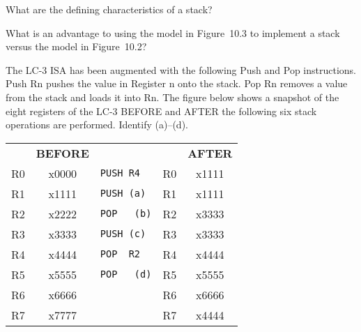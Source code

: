 \documentclass{patt}
\begin{document}
\FloatBarrier
\begin{exercises}

\item [8.1]
  What are the defining characteristics of a stack?

\item [8.2]
  What is an advantage to using the model in Figure~10.3 to implement
  a stack versus the model in Figure~10.2?

\item [8.3]
  The LC-3 ISA has been augmented with the following Push and Pop
  instructions. Push Rn pushes the value in Register n onto the stack.
  Pop Rn removes a value from the stack and loads it into Rn. The
  figure below shows a snapshot of the eight registers of the LC-3
  BEFORE and AFTER the following six stack operations are
  performed. Identify (a)--(d).

\begin{center}
{\fontsize{8}{10}\selectfont\sans\begin{tabular}{ccl@{\ \,}cc}
& {\bf BEFORE} & & & {\bf AFTER}\\
\cline{2-2}\cline{5-5}
\multicolumn{1}{c}{R0} & \multicolumn{1}{|c|}{x0000} & {\tt \fontsize{9}{12}\selectfont\color{seventyblack}PUSH R4} & R0 &
\multicolumn{1}{|c|}{x1111}\\
\cline{2-2}\cline{5-5}
\multicolumn{1}{c}{R1} & \multicolumn{1}{|c|}{x1111} & {\tt \fontsize{9}{12}\selectfont\color{seventyblack}PUSH \!\!\!\! (a)} & R1 &
\multicolumn{1}{|c|}{x1111}\\
\cline{2-2}\cline{5-5}
\multicolumn{1}{c}{R2} & \multicolumn{1}{|c|}{x2222} & {\tt \fontsize{9}{12}\selectfont\color{seventyblack}POP \,\!\! (b)} & R2 &
\multicolumn{1}{|c|}{x3333}\\
\cline{2-2}\cline{5-5}
\multicolumn{1}{c}{R3} & \multicolumn{1}{|c|}{x3333} & {\tt \fontsize{9}{12}\selectfont\color{seventyblack}PUSH \!\!\!\! (c)} & R3 &
\multicolumn{1}{|c|}{x3333}\\
\cline{2-2}\cline{5-5}
\multicolumn{1}{c}{R4} & \multicolumn{1}{|c|}{x4444} & {\tt \fontsize{9}{12}\selectfont\color{seventyblack}POP \ R2} & R4 &
\multicolumn{1}{|c|}{x4444}\\
\cline{2-2}\cline{5-5}
\multicolumn{1}{c}{R5} & \multicolumn{1}{|c|}{x5555} & {\tt \fontsize{9}{12}\selectfont\color{seventyblack}POP \,\!\! (d)} & R5 &
\multicolumn{1}{|c|}{x5555}\\
\cline{2-2}\cline{5-5}
\multicolumn{1}{c}{R6} & \multicolumn{1}{|c|}{x6666} & & R6 &
\multicolumn{1}{|c|}{x6666}\\
\cline{2-2}\cline{5-5}
\multicolumn{1}{c}{R7} & \multicolumn{1}{|c|}{x7777} & & R7 &
\multicolumn{1}{|c|}{x4444}\\
\cline{2-2}\cline{5-5}
\end{tabular}}
\end{center}


\end{exercises}
\end{document}
